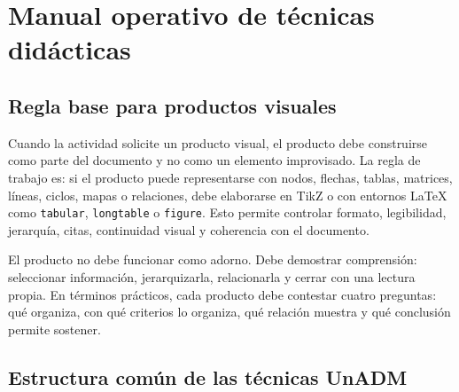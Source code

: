 %
%

\clearpage
\section{Manual operativo de técnicas didácticas}

\subsection{Regla base para productos visuales}

Cuando la actividad solicite un producto visual, el producto debe construirse como parte del documento y no como un elemento improvisado. La regla de trabajo es: si el producto puede representarse con nodos, flechas, tablas, matrices, líneas, ciclos, mapas o relaciones, debe elaborarse en TikZ o con entornos LaTeX como \texttt{tabular}, \texttt{longtable} o \texttt{figure}. Esto permite controlar formato, legibilidad, jerarquía, citas, continuidad visual y coherencia con el documento.

El producto no debe funcionar como adorno. Debe demostrar comprensión: seleccionar información, jerarquizarla, relacionarla y cerrar con una lectura propia. En términos prácticos, cada producto debe contestar cuatro preguntas: qué organiza, con qué criterios lo organiza, qué relación muestra y qué conclusión permite sostener.

\subsection{Estructura común de las técnicas UnADM}

